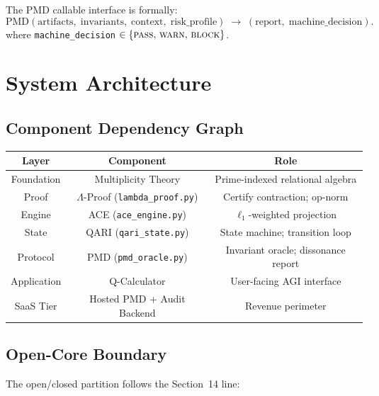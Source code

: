 \documentclass[12pt,letterpaper]{article}
\begin{document}
The PMD callable interface is formally:
\[
  \text{PMD}(\text{artifacts},\; \text{invariants},\; \text{context},\;
  \text{risk\_profile}) \;\to\; (\text{report},\; \text{machine\_decision}).
\]
where \texttt{machine\_decision} $\in \{\textsc{pass},\, \textsc{warn},\,
\textsc{block}\}$.

\section{System Architecture}

\subsection{Component Dependency Graph}

\begin{center}
\begin{tabular}{ccc}
  \textbf{Layer} & \textbf{Component} & \textbf{Role} \\
  \toprule
  Foundation & Multiplicity Theory & Prime-indexed relational algebra \\
  \midrule
  Proof       & $\Lambda$-Proof (\texttt{lambda\_proof.py}) & Certify contraction; op-norm \\
  Engine      & ACE (\texttt{ace\_engine.py})    & $\ell_1$-weighted projection \\
  State       & QARI (\texttt{qari\_state.py})  & State machine; transition loop \\
  Protocol    & PMD (\texttt{pmd\_oracle.py})   & Invariant oracle; dissonance report \\
  Application & Q-Calculator                    & User-facing AGI interface \\
  \midrule
  SaaS Tier   & Hosted PMD + Audit Backend      & Revenue perimeter \\
  \bottomrule
\end{tabular}
\end{center}

\subsection{Open-Core Boundary}

The open/closed partition follows the Section~14 line:
\end{document}
